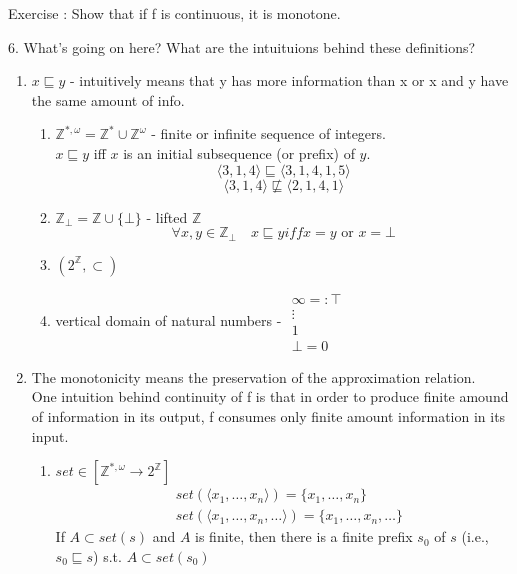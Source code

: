 \documentclass{report}[12pt]
\begin{document}
Exercise : Show that if f is continuous, it is monotone.

6. What's going on here? What are the intuituions behind these definitions?
\begin{enumerate}
    \item $x \sqsubseteq y$ - intuitively means that y has more information than x or x and y have the same amount of info.
    \begin{enumerate}
        \item $\mathbb{Z}^{*, \omega} = \mathbb{Z}^* \cup \mathbb{Z}^\omega$ - finite or infinite sequence of integers. \\
        $x\sqsubseteq y$ iff $x$ is an initial subsequence (or prefix) of $y$.
        \[\langle 3, 1, 4 \rangle \sqsubseteq \langle 3, 1, 4, 1, 5 \rangle\]
        \[\langle 3, 1, 4 \rangle \not\sqsubseteq \langle 2, 1, 4, 1 \rangle\]
        \item $\mathbb{Z}_\bot=\mathbb{Z}\cup \{\bot\}$ - lifted $\mathbb{Z}$ \\
        \[\forall x, y \in \mathbb{Z}_\bot \quad x\sqsubseteq y iff x=y \text{ or }x=\bot\]
        \item $(2^{\mathbb{Z}}, \subset)$
        \item vertical domain of natural numbers - $\begin{array}{c}\infty=:\top \\\vdots \\ 1 \\ \bot=0\end{array}$
    \end{enumerate}
    \item The monotonicity means the preservation of the approximation relation. \\
    One intuition behind continuity of f is that in order to produce finite amound of information in its output, f consumes only finite amount information in its input.
    \begin{enumerate}
        \item $set \in [\mathbb{Z}^{*, \omega}\rightarrow 2^{\mathbb{Z}}]$ \\
        \begin{align*}
            &set(\langle x_1, \ldots, x_n \rangle) = \{x_1, \ldots, x_n\} \\
            &set(\langle x_1, \ldots, x_n, \ldots \rangle) = \{x_1, \ldots, x_n, \ldots\}
        \end{align*}
        If $A \subset set(s)$ and $A$ is finite, then there is a finite prefix $s_0$ of $s$ (i.e., $s_0 \sqsubseteq s$) s.t. $A \subset set(s_0)$ \\

\end{enumerate}
\end{enumerate}
\end{document}
